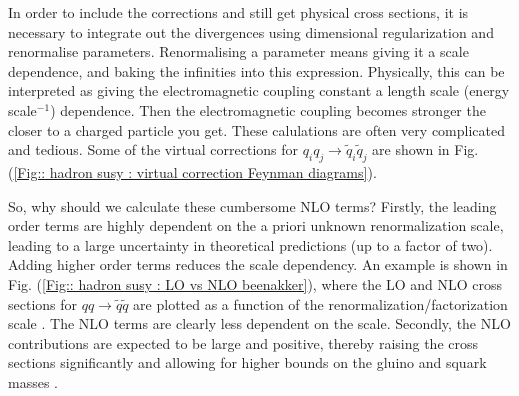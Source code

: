 \documentclass[twoside,english]{uiofysmaster}
\begin{document}
In order to include the corrections and still get physical cross sections, it is necessary to integrate out the divergences using dimensional regularization and renormalise parameters. Renormalising a parameter means giving it a scale dependence, and baking the infinities into this expression. Physically, this can be interpreted as giving the electromagnetic coupling constant a length scale (energy scale$^{-1}$) dependence. Then the electromagnetic coupling becomes stronger the closer to a charged particle you get. These calulations are often very complicated and tedious. Some of the virtual corrections for $q_iq_j \rightarrow \tilde{q}_i \tilde{q}_j$ are shown in Fig. (\ref{Fig:: hadron susy : virtual correction Feynman diagrams}).

So, why should we calculate these cumbersome NLO terms? Firstly, the leading order terms are highly dependent on the a priori unknown renormalization scale, leading to a large uncertainty in theoretical predictions (up to a factor of two). Adding higher order terms reduces the scale dependency. An example is shown in Fig. (\ref{Fig:: hadron susy : LO vs NLO beenakker}), where the LO and NLO cross sections for $qq \rightarrow \tilde{q} \tilde{q}$ are plotted as a function of the renormalization/factorization scale \cite{beenakker1997squark}. The NLO terms are clearly less dependent on the scale.  Secondly, the NLO contributions are expected to be large and positive, thereby raising the cross sections significantly and allowing for higher bounds on the gluino and squark masses \cite{beenakker1997squark}.
\end{document}
